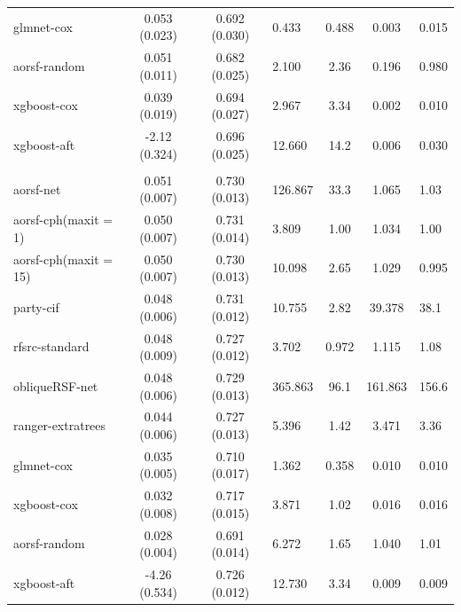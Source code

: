 \documentclass[twoside,11pt]{article}\usepackage[]{graphicx}\usepackage[]{color}
\newenvironment{knitrout}{}{} %
\begin{document}
\begin{knitrout}
\begin{longtable}{lcclccl}
\hspace{1em}glmnet-cox & 0.053 (0.023) & 0.692 (0.030) & 0.433 & 0.488 & 0.003 & 0.015\\
\hspace{1em}aorsf-random & 0.051 (0.011) & 0.682 (0.025) & 2.100 & 2.36 & 0.196 & 0.980\\
\hspace{1em}xgboost-cox & 0.039 (0.019) & 0.694 (0.027) & 2.967 & 3.34 & 0.002 & 0.010\\
\hspace{1em}xgboost-aft & -2.12 (0.324) & 0.696 (0.025) & 12.660 & 14.2 & 0.006 & 0.030\\
\addlinespace[0.3em]
\hline
\multicolumn{7}{l}{\textit{\textbf{Heart Transplant; graft-loss or death, n = 3787, p = 52}}}\\
\hline
\hspace{1em}aorsf-net & 0.051 (0.007) & 0.730 (0.013) & 126.867 & 33.3 & 1.065 & 1.03\\
\hspace{1em}aorsf-cph(maxit = 1) & 0.050 (0.007) & 0.731 (0.014) & 3.809 & 1.00 & 1.034 & 1.00\\
\hspace{1em}aorsf-cph(maxit = 15) & 0.050 (0.007) & 0.730 (0.013) & 10.098 & 2.65 & 1.029 & 0.995\\
\hspace{1em}party-cif & 0.048 (0.006) & 0.731 (0.012) & 10.755 & 2.82 & 39.378 & 38.1\\
\hspace{1em}rfsrc-standard & 0.048 (0.009) & 0.727 (0.012) & 3.702 & 0.972 & 1.115 & 1.08\\
\hspace{1em}obliqueRSF-net & 0.048 (0.006) & 0.729 (0.013) & 365.863 & 96.1 & 161.863 & 156.6\\
\hspace{1em}ranger-extratrees & 0.044 (0.006) & 0.727 (0.013) & 5.396 & 1.42 & 3.471 & 3.36\\
\hspace{1em}glmnet-cox & 0.035 (0.005) & 0.710 (0.017) & 1.362 & 0.358 & 0.010 & 0.010\\
\hspace{1em}xgboost-cox & 0.032 (0.008) & 0.717 (0.015) & 3.871 & 1.02 & 0.016 & 0.016\\
\hspace{1em}aorsf-random & 0.028 (0.004) & 0.691 (0.014) & 6.272 & 1.65 & 1.040 & 1.01\\
\hspace{1em}xgboost-aft & -4.26 (0.534) & 0.726 (0.012) & 12.730 & 3.34 & 0.009 & 0.009\\

\end{longtable}
\end{knitrout}
\end{document}
